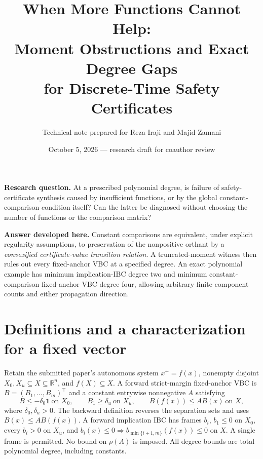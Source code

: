 \documentclass[10pt,letterpaper]{article}
\title{When More Functions Cannot Help:\\Moment Obstructions and Exact Degree Gaps\\for Discrete-Time Safety Certificates}
\author{Technical note prepared for Reza Iraji and Majid Zamani}
\date{October 5, 2026 --- research draft for coauthor review}
\newcommand{\R}{\mathbb R}
\begin{document}
\maketitle
\vspace{-1em}
\textbf{Research question.} At a prescribed polynomial degree, is failure of safety-certificate synthesis caused by insufficient functions, or by the global constant-comparison condition itself? Can the latter be diagnosed without choosing the number of functions or the comparison matrix?

\textbf{Answer developed here.} Constant comparisons are equivalent, under explicit regularity assumptions, to preservation of the nonpositive orthant by a \emph{convexified certificate-value transition relation}. A truncated-moment witness then rules out every fixed-anchor VBC at a specified degree. An exact polynomial example has minimum implication-IBC degree two and minimum constant-comparison fixed-anchor VBC degree four, allowing arbitrary finite component counts and either propagation direction.

\section{Definitions and a characterization for a fixed vector}
Retain the submitted paper's autonomous system $x^+=f(x)$, nonempty disjoint $X_0,X_u\subseteq X\subseteq\R^n$, and $f(X)\subseteq X$. A forward strict-margin fixed-anchor VBC is $B=(B_1,\ldots,B_m)^\top$ and a constant entrywise nonnegative $A$ satisfying
\begin{equation}\label{eq:vbc}
 B\leq-\delta_0\mathbf1\ \text{on }X_0,\qquad B_1\geq\delta_u\ \text{on }X_u,\qquad B(f(x))\leq AB(x)\ \text{on }X,
\end{equation}
where $\delta_0,\delta_u>0$. The backward definition reverses the separation sets and uses $B(x)\leq AB(f(x))$. A forward implication IBC has frames $b_i$, $b_1\leq0$ on $X_0$, every $b_i>0$ on $X_u$, and $b_i(x)\leq0\Rightarrow b_{\min\{i+1,m\}}(f(x))\leq0$ on $X$. A single frame is permitted. No bound on $\rho(A)$ is imposed. All degree bounds are total polynomial degree, including constants.
\end{document}
